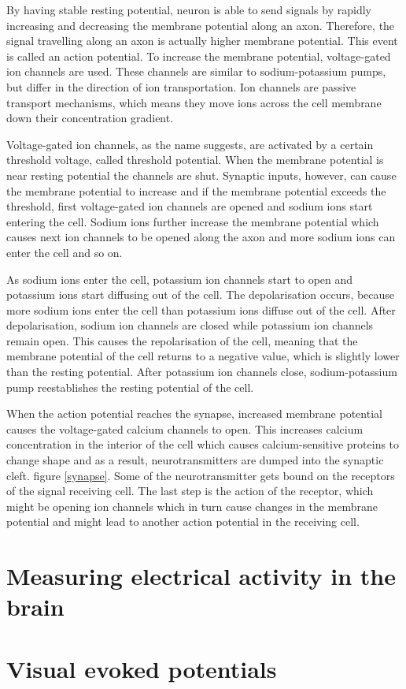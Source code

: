 By having stable resting potential, neuron is able to send signals by rapidly increasing and decreasing the membrane potential along an axon. Therefore, the signal travelling along an axon is actually higher membrane potential. This event is called an action potential. To increase the membrane potential, voltage-gated ion channels are used. These channels are similar to sodium-potassium pumps, but differ in the direction of ion transportation. Ion channels are passive transport mechanisms, which means they move ions across the cell membrane down their concentration gradient.

Voltage-gated ion channels, as the name suggests, are activated by a certain threshold voltage, called threshold potential. When the membrane potential is near resting potential the channels are shut. Synaptic inputs, however, can cause the membrane potential to increase and if the membrane potential exceeds the threshold, first voltage-gated ion channels are opened and sodium ions start entering the cell. Sodium ions further increase the membrane potential which causes next ion channels to be opened along the axon and more sodium ions can enter the cell and so on.

As sodium ions enter the cell, potassium ion channels start to open and potassium ions start diffusing out of the cell. The depolarisation occurs, because more sodium ions enter the cell than potassium ions diffuse out of the cell. After depolarisation, sodium ion channels are closed while potassium ion channels remain open. This causes the repolarisation of the cell, meaning that the membrane potential of the cell returns to a negative value, which is slightly lower than the resting potential. After potassium ion channels close, sodium-potassium pump reestablishes the resting potential of the cell.

When the action potential reaches the synapse, increased membrane potential causes the voltage-gated calcium channels to open. This increases calcium concentration in the interior of the cell which causes calcium-sensitive proteins to change shape and as a result, neurotransmitters are dumped into the synaptic cleft. figure \ref{synapse}. Some of the neurotransmitter gets bound on the receptors of the signal receiving cell. The last step is the action of the receptor, which might be opening ion channels which in turn cause changes in the membrane potential and might lead to another action potential in the receiving cell.
 
\section{Measuring electrical activity in the brain}
\section{Visual evoked potentials}
 